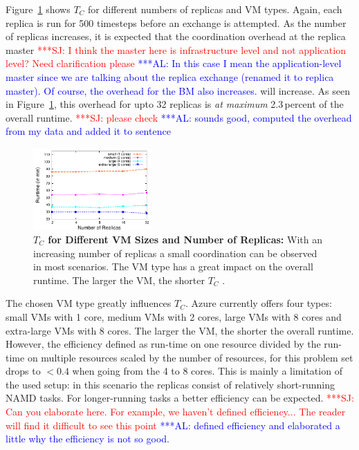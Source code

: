 \documentclass[conference,final]{IEEEtran}
\newcommand{\up}{\vspace*{-1em}}
\newcommand{\tc}{$T_{C}$ }
\newcommand{\tcnsp}{$T_{C}$}
\newcommand{\alnote}[1]{ {\textcolor{blue} { ***AL: #1 }}}
\newcommand{\jhanote}[1]{ {\textcolor{red} { ***SJ: #1 }}}
\newcommand{\alnote}[1]{}
\newcommand{\jhanote}[1]{}
\begin{document}
Figure~\ref{fig:performance_repex_scaleout_vmsizes} shows \tc for
different numbers of replicas and VM types.  Again, each replica is
run for 500 timesteps before an exchange is attempted. As the number
of replicas increases, it is expected that the coordination overhead
at the replica master \jhanote{I think the master here is infrastructure level
  and not application level? Need clarification please} \alnote{In this
  case I mean the application-level master since we are talking about
  the replica exchange (renamed it to replica master). 
  Of course, the overhead for the BM also increases.} will
increase. As seen in
Figure~\ref{fig:performance_repex_scaleout_vmsizes}, this
overhead for upto 32 replicas is {\it at maximum} 2.3\,percent of the
overall runtime. \jhanote{please check} \alnote{sounds good, computed the
overhead from my data and added it to sentence}
\begin{figure}[ht]
    \centering
        \includegraphics[width=0.4\textwidth]{performance/repex-azure.pdf}
        \caption{\textbf{\tc for Different VM Sizes and Number of
            Replicas:} With an increasing number of replicas a small
          coordination can be observed in most scenarios. The VM type
          has a great impact on the overall runtime. The larger the
          VM, the shorter \tc. }
    \label{fig:performance_repex_scaleout_vmsizes}
    \up
\end{figure}

The chosen VM type greatly influences \tcnsp. Azure currently offers
four types: small VMs with 1 core, medium VMs with 2 cores, large VMs
with 8 cores and extra-large VMs with 8 cores. The larger the VM, the
shorter the overall runtime.  However, the efficiency
defined as run-time on one resource divided by the run-time on multiple 
resources scaled by the number of resources, for this problem
set drops to $<0.4$ when going from the 4 to 8 cores. This
is mainly a limitation of the used setup: in this scenario
the replicas consist of relatively short-running NAMD tasks. 
For longer-running tasks a better efficiency can be expected.
\jhanote{Can you
  elaborate here. For example, we haven't defined efficiency... The
  reader will find it difficult to see this point}\alnote{defined efficiency
  and elaborated a little why the efficiency is not so good.}
\end{document}
